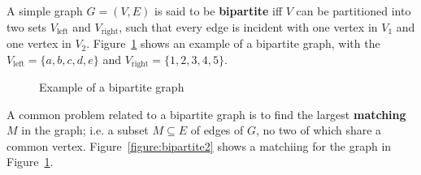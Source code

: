 \documentclass [12pt]{article}
\theoremstyle{definition}
\begin{document}
A simple graph $G=(V,E)$ is said to be \textbf{bipartite} iff $V$ can be partitioned into two sets $V_{\mbox{left}}$ and $V_{\mbox{right}}$, such that every edge is incident
with one vertex in $V_{1}$ and one vertex in $V_{2}$. Figure~\ref{figure:bipartite} shows an example of a bipartite graph, with the $V_{\mbox{left}}=\{a,b,c,d,e\}$ and
$V_{\mbox{right}}=\{1,2,3,4,5\}$.


\begin{figure}
\centering
{}
\caption{Example of a bipartite graph}
\label{figure:bipartite}
\end{figure}

A common problem related to a bipartite graph is to find the largest \textbf{matching} $M$ in the graph; i.e. a subset $M\subseteq E$ of edges of $G$, no two of which share a common vertex.
Figure~\ref{figure:bipartite2} shows a matchiing for the graph in Figure~\ref{figure:bipartite}.
\end{document}
